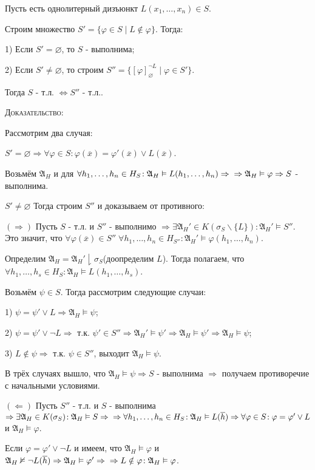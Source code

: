 \documentclass[18pt, a4paper]{extarticle}
\newcommand{\mA}{\mathfrak{A}}
\newcommand{\dok}{\textsc{Доказательство:}}
\newcommand{\rightdok}{\boxed{(\Rightarrow)}}
\newcommand{\leftdok}{\boxed{(\Leftarrow)}}
\newcommand{\ovl}[1]{\overline{#1}}
\newcommand{\vp}{\varphi}
\newcommand{\vD}{\vDash}
\newcommand{\sg}{\sigma}
\newcommand{\lot}[3]{#1_#2,\dots,#1_#3}
\begin{document}
Пусть есть однолитерный дизъюнкт $L(\lot x 1 n)\in S$.

Строим множество $S'=\{\vp\in S\;|\;L\notin\vp\}$. Тогда:

1) Если $S'=\varnothing$, то $S$ - выполнима;

2) Если $S'\neq\varnothing$, то строим $S''=\{[\vp]^{\lnot L}_\varnothing\;|\;\vp\in S'\}$. 

Тогда $S$ - т.л. $\Leftrightarrow S''$ - т.л..

\dok

Рассмотрим два случая:

$\boxed{S'=\varnothing}\Rightarrow\forall\vp\in S\!:\vp(\ovl x)=\vp'(\ovl x)\vee L(\ovl x)$.

Возьмём $\mA_H$ и для $\forall\lot h 1 n\in H_S\!:\mA_H\vD L(\lot h 1 n)\Rightarrow\newline\Rightarrow\mA_H\vD\vp\Rightarrow S$ - выполнима.

$\boxed{S'\neq\varnothing}$ Тогда строим $S''$ и доказываем от противного:

$\rightdok$ Пусть $S$ - т.л. и $S''$ - выполнимо $\Rightarrow\exists\mA_H'\in K(\sg_S\backslash\{L\})\!:\mA_H'\vD S''$. Это значит, что $\forall\vp(\ovl x)\in S''\;\forall\lot h 1 n\in H_{S''}\!:\mA_H'\vD\vp(\lot h 1 n)$.

Определим $\mA_H=\mA_H'\downharpoonright\sg_S$(доопределим $L$). Тогда полагаем, что\\ $\forall\lot h 1 s\in H_S\!:\mA_H\vD L(\lot h 1 s)$. 

Возьмём $\psi\in S$. Тогда рассмотрим следующие случаи:

1) $\psi=\psi'\vee L\Rightarrow\mA_H\vD\psi$;

2) $\psi=\psi'\vee\lnot L\Rightarrow$ т.к. $\psi'\in S''\Rightarrow\mA_H'\vD\psi'\Rightarrow\mA_H\vD\psi'\Rightarrow\mA_H\vD\psi$;

3) $L\notin\psi\Rightarrow$ т.к. $\psi\in S''$, выходит $\mA_H\vD\psi$.

В трёх случаях вышло, что $\mA_H\vD\psi\Rightarrow S$ - выполнима $\Rightarrow$ получаем противоречие с начальными условиями.

$\leftdok$ Пусть $S''$ - т.л. и $S$ - выполнима $\Rightarrow\exists\mA_H\in K(\sg_S)\!:\mA_H\vD S\Rightarrow\newline\Rightarrow\forall\lot h 1 n\in H_S\!:\mA_H\vD L(\ovl h)\Rightarrow\forall\vp\in S\!:\vp=\vp'\vee L$ и $\mA_H\vD\vp$.

Если $\vp=\vp'\vee\lnot L$ и имеем, что $\mA_H\vD\vp$ и $\mA_H\nvDash\lnot L(\ovl h)\Rightarrow\mA_H\vD\vp'\Rightarrow\newline\Rightarrow L\notin\vp\!:\mA_H\vD\vp$.%
\end{document}
